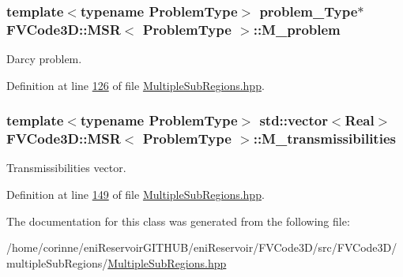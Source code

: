 \subsubsection[{\texorpdfstring{M\+\_\+problem}{M_problem}}]{\setlength{\rightskip}{0pt plus 5cm}template$<$typename Problem\+Type$>$ {\bf problem\+\_\+\+Type}$\ast$ {\bf F\+V\+Code3\+D\+::\+M\+SR}$<$ Problem\+Type $>$\+::M\+\_\+problem\hspace{0.3cm}{\ttfamily [private]}}\hypertarget{classFVCode3D_1_1MSR_a531760a5415f63b7be6087ab117031e5}{}\label{classFVCode3D_1_1MSR_a531760a5415f63b7be6087ab117031e5}


Darcy problem. 



Definition at line \hyperlink{MultipleSubRegions_8hpp_source_l00126}{126} of file \hyperlink{MultipleSubRegions_8hpp_source}{Multiple\+Sub\+Regions.\+hpp}.

\subsubsection[{\texorpdfstring{M\+\_\+transmissibilities}{M_transmissibilities}}]{\setlength{\rightskip}{0pt plus 5cm}template$<$typename Problem\+Type$>$ std\+::vector$<${\bf Real}$>$ {\bf F\+V\+Code3\+D\+::\+M\+SR}$<$ Problem\+Type $>$\+::M\+\_\+transmissibilities\hspace{0.3cm}{\ttfamily [private]}}\hypertarget{classFVCode3D_1_1MSR_abcb3d099c26d9747b02231cb0d3b7bb3}{}\label{classFVCode3D_1_1MSR_abcb3d099c26d9747b02231cb0d3b7bb3}


Transmissibilities vector. 



Definition at line \hyperlink{MultipleSubRegions_8hpp_source_l00149}{149} of file \hyperlink{MultipleSubRegions_8hpp_source}{Multiple\+Sub\+Regions.\+hpp}.



The documentation for this class was generated from the following file\+:\begin{DoxyCompactItemize}
\item 
/home/corinne/eni\+Reservoir\+G\+I\+T\+H\+U\+B/eni\+Reservoir/\+F\+V\+Code3\+D/src/\+F\+V\+Code3\+D/multiple\+Sub\+Regions/\hyperlink{MultipleSubRegions_8hpp}{Multiple\+Sub\+Regions.\+hpp}\end{DoxyCompactItemize}
